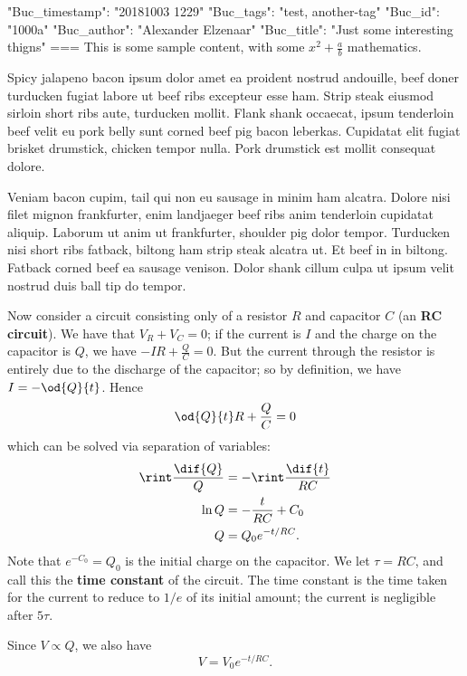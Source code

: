 {"Buc_timestamp": "20181003 1229"}
{"Buc_tags": "test, another-tag"}
{"Buc_id": "1000a"}
{"Buc_author": "Alexander Elzenaar"}
{"Buc_title": "Just some interesting thigns"}
===
This is some sample content, with some $ x^2 + \frac{a}{b} $ mathematics.

Spicy jalapeno bacon ipsum dolor amet ea proident nostrud andouille, beef doner turducken fugiat labore ut beef ribs excepteur esse ham. Strip steak eiusmod sirloin short ribs aute, turducken mollit. Flank shank occaecat, ipsum tenderloin beef velit eu pork belly sunt corned beef pig bacon leberkas. Cupidatat elit fugiat brisket drumstick, chicken tempor nulla. Pork drumstick est mollit consequat dolore.

Veniam bacon cupim, tail qui non eu sausage in minim ham alcatra. Dolore nisi filet mignon frankfurter, enim landjaeger beef ribs anim tenderloin cupidatat aliquip. Laborum ut anim ut frankfurter, shoulder pig dolor tempor. Turducken nisi short ribs fatback, biltong ham strip steak alcatra ut. Et beef in in biltong. Fatback corned beef ea sausage venison. Dolor shank cillum culpa ut ipsum velit nostrud duis ball tip do tempor.

Now consider a circuit consisting only of a resistor $ R $ and capacitor $ C $ (an \textbf{RC circuit}). We have that $ V_R + V_C = 0 $;
if the current is $ I $ and the charge on the capacitor is $ Q $, we have $ -IR + \frac{Q}{C} = 0 $.
But the current through the resistor is entirely due to the discharge of the capacitor; so by definition,
we have $ I = -\od{Q}{t} $. Hence
\begin{displaymath}
  \od{Q}{t} R + \frac{Q}{C} = 0
\end{displaymath}
which can be solved via separation of variables:
\begin{align}
  \rint \frac{\dif{Q}}{Q} &= -\rint \frac{\dif{t}}{RC}\nonumber\\
  \ln Q &= -\frac{t}{RC} + C_0\nonumber\\
  Q &= Q_0 e^{-t/RC}.
\end{align}
Note that $ e^{-C_0} = Q_0 $ is the initial charge on the capacitor. We let $ \tau = RC $, and call this the
\textbf{time constant} of the circuit. The time constant is the time taken for the current to reduce to $ 1/e $
of its initial amount; the current is negligible after $ 5\tau $.

Since $ V \propto Q $, we also have
\begin{equation}
  V = V_0 e^{-t/RC}.
\end{equation}

